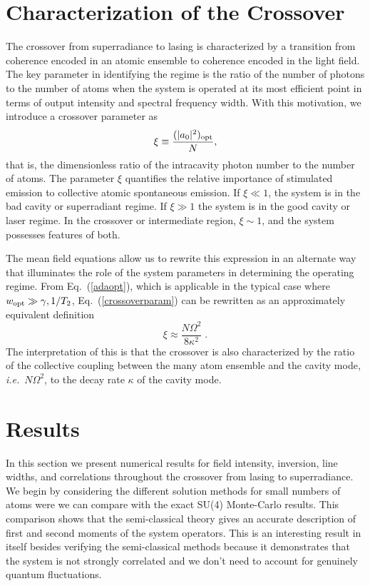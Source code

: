 \documentclass[aps,
twocolumn,
showpacs,
superscriptaddress,groupedaddress]{revtex4}
\begin{document}
\section{Characterization of the Crossover}
\label{sec:CrossoverCharacterization}

The crossover from superradiance to lasing is characterized by a
transition from coherence encoded in an atomic ensemble to coherence
encoded in the light field. The key parameter in identifying the regime
is the ratio of the number of photons to the number of atoms when the
system is operated at its most efficient point in terms of output
intensity and spectral frequency width. With this motivation, we
introduce a crossover parameter as
\begin{equation}
\xi \equiv \frac{(|a_0|^2)_{\rm opt}}{N},
\label{crossoverparam}
\end{equation}
that is, the dimensionless ratio of the intracavity photon number to
the number of atoms. The parameter $\xi$ quantifies the relative
importance of stimulated emission to collective atomic spontaneous
emission. If $\xi\ll1$, the system is in the bad cavity or
superradiant regime. If $\xi\gg1$ the system is in the good cavity or
laser regime. In the crossover or intermediate region, $\xi\sim1$, and
the system possesses features of both.

The mean field equations allow us to rewrite this expression in an
alternate way that illuminates the role of the system parameters in
determining the operating regime. From Eq.~(\ref{adaopt}), which is
applicable in the typical case where $w_{\rm opt}\gg\gamma,1/T_2$,
Eq.~(\ref{crossoverparam}) can be rewritten as an approximately
equivalent definition
\begin{equation}
\xi\approx \frac{N \Omega^2}{8\kappa^2}\;.
\label{CrossoverParameter2}
\end{equation}
The interpretation of this is that the crossover is also characterized
by the ratio of the collective coupling between the many atom ensemble
and the cavity mode, {\em i.e.}\ $N\Omega^2$, to the decay
rate $\kappa$ of the cavity mode.

\section{Results}
\label{sec:Results}

In this section we present numerical results for field intensity,
inversion, line widths, and correlations throughout the crossover from
lasing to superradiance.  We begin by considering the different solution
methods for small numbers of atoms were we can compare with the exact
SU(4) Monte-Carlo results.  This comparison shows that the semi-classical
theory gives an accurate description of first and second moments of the
system operators.  This is an interesting result in itself besides
verifying the semi-classical methods because it demonstrates that the
system is not strongly correlated and we don't need to account for
genuinely quantum fluctuations.
\end{document}
